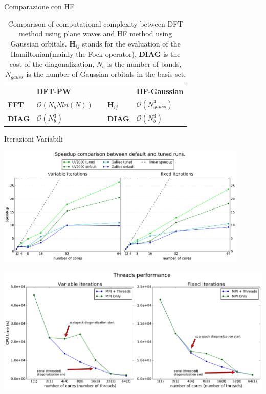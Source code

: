 \documentclass[8pt]{beamer}
\newcommand\mf[1]{\mathbf{#1}}
\newcommand\bigO{\mathcal{O}}
\begin{document}
\begin{frame}{Comparazione con HF}

\begin{table}[h]
\centering
\begin{tabular}{l|l|ll|l|}
\cline{2-2} \cline{5-5}
                                    & \textbf{DFT-PW}        &                       &                    & \textbf{HF-Gaussian} \\ \cline{1-2} \cline{4-5} 
\multicolumn{1}{|l|}{\textbf{FFT}}  & $\bigO(N_{b}N ln(N) )$ & \multicolumn{1}{l|}{} & $\mf{H}_{ij}$ & $\bigO(N_{gauss}^4)$ \\ \cline{1-2} \cline{4-5} 
\multicolumn{1}{|l|}{\textbf{DIAG}} & $\bigO(N_{b}^3)$       & \multicolumn{1}{l|}{} & \textbf{DIAG}      & $\bigO(N_{b}^3)$     \\ \cline{1-2} \cline{4-5} 
\end{tabular}
\caption{Comparison of computational complexity between DFT method using plane waves and HF method using Gaussian orbitals. $\mf{H}_{ij}$ stands for the evaluation of the Hamiltonian(mainly the Fock operator), \textbf{DIAG} is the cost of the diagonalization, $N_b$ is the number of bands, $N_{gauss}$ is the number of Gaussian orbitals in the basis set.}
\label{tab:HF-DFTComp}
\end{table}
\end{frame}


\begin{frame}{Iterazioni Variabili}
	\begin{center}
		\includegraphics[width=0.9\textwidth]{concl_final_comparison.pdf}
	\end{center}
\end{frame}

\begin{frame}
	\begin{center}
		\includegraphics[width=\textwidth]{threads_overall.pdf}
	\end{center}
\end{frame}
\end{document}
